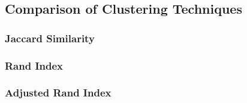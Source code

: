 \documentclass[12pt]{article}
\begin{document}
\subsection{Comparison of Clustering Techniques}
\subsubsection{Jaccard Similarity}

\subsubsection{Rand Index}

\subsubsection{Adjusted Rand Index}

\newpage



\end{document}

